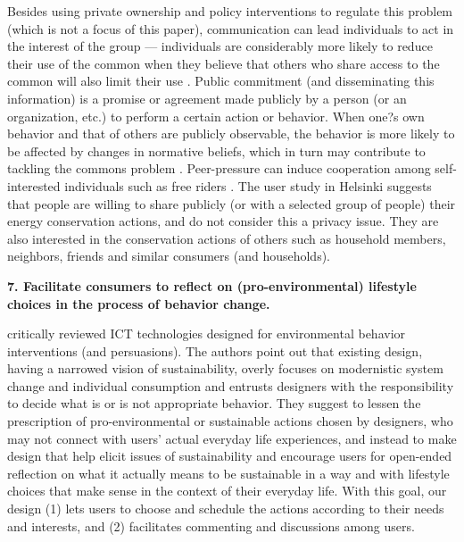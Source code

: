 Besides using private ownership and policy interventions to regulate this problem (which is not a focus of this paper), communication can lead individuals to act in the interest of the group --- individuals are considerably more likely to reduce their use of the common when they believe that others who share access to the common will also limit their use  \citep{Edney1978,Schultz2002}. Public commitment (and disseminating this information)  \citep{mckenzie2000fostering,Abrahamse2005} is a promise or agreement made publicly by a person (or an organization, etc.) to perform a certain action or behavior. When one?s own behavior and that of others are publicly observable, the behavior is more likely to be affected by changes in normative beliefs, which in turn may contribute to tackling the commons problem  \citep{yim2011tale,Schultz2002}. Peer-pressure can induce cooperation among self-interested individuals such as free riders  \citep{mani2013inducing}. The user study in Helsinki suggests that people are willing to share publicly (or with a selected group of people) their energy conservation actions, and do not consider this a privacy issue. They are also interested in the conservation actions of others such as household members, neighbors, friends and similar consumers (and households). 

\vspace{.3cm}
\noindent\textbf{7. Facilitate consumers to reflect on (pro-environmental) lifestyle choices in the process of behavior change.}

\citet{Brynjarsdottir2012} critically reviewed ICT technologies designed for environmental behavior interventions (and persuasions). The authors point out that existing design, having a narrowed vision of sustainability, overly focuses on modernistic system change and individual consumption and entrusts designers with the responsibility to decide what is or is not appropriate behavior. They suggest to lessen the prescription of pro-environmental or sustainable actions chosen by designers, who may not connect with users' actual everyday life experiences, and instead to make design that help elicit issues of sustainability and encourage users for open-ended reflection on what it actually means to be sustainable in a way and with lifestyle choices that make sense in the context of their everyday life. With this goal, our design (1) lets users to choose and schedule the actions according to their needs and interests, and (2) facilitates commenting and discussions among users. 

